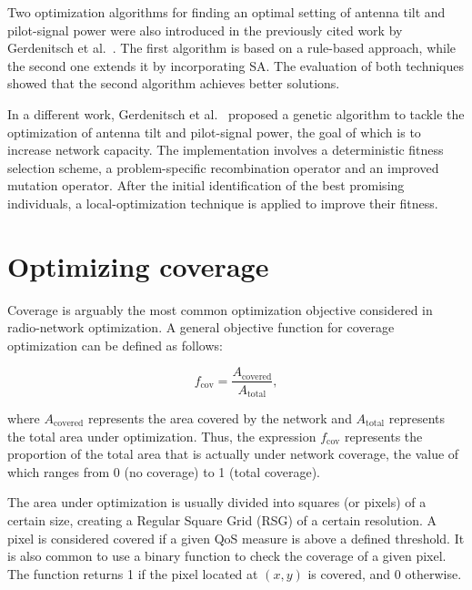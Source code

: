 Two optimization algorithms for finding an optimal setting of antenna
tilt and pilot-signal power were also introduced in the previously
cited work by Gerdenitsch et al.~\cite{Antenna.tilt.and.CPICH:2003}.
The first algorithm is based on a rule-based approach, while the second
one extends it by incorporating SA. The evaluation of both techniques
showed that the second algorithm achieves better solutions.

In a different work, Gerdenitsch et al.~\cite{GA.for.tilt.and.CPICH:2004}
proposed a genetic algorithm to tackle the optimization of antenna
tilt and pilot-signal power, the goal of which is to increase network
capacity. The implementation involves a deterministic fitness selection
scheme, a problem-specific recombination operator and an improved
mutation operator. After the initial identification of the best promising
individuals, a local-optimization technique is applied to improve
their fitness.


\section{Optimizing coverage \label{sec:Optimizing-coverage}}

Coverage is arguably the most common optimization objective considered
in radio-network optimization. A general objective function for coverage
optimization can be defined as follows:

\[
f_{\mathrm{cov}}=\frac{A_{\mathrm{covered}}}{A_{\mathrm{total}}},
\]


\noindent {}

\noindent where $A_{\mathrm{covered}}$ represents the area covered
by the network and $A_{\mathrm{total}}$ represents the total area
under optimization. Thus, the expression $f_{\mathrm{cov}}$ represents
the proportion of the total area that is actually under network coverage,
the value of which ranges from 0 (no coverage) to 1 (total coverage).

The area under optimization is usually divided into squares (or pixels)
of a certain size, creating a Regular Square Grid (RSG)
of a certain resolution. A pixel is considered covered if a given
QoS measure is above a defined threshold. It is also common to use
a binary function to check the coverage of a given pixel. The function
returns 1 if the pixel located at $(x,y)$ is covered, and 0 otherwise.


